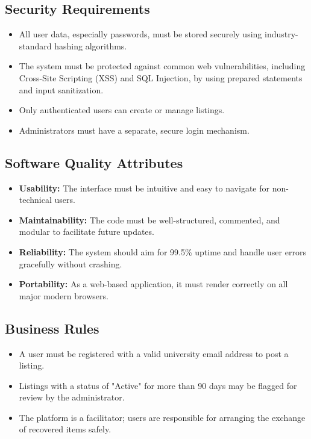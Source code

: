\documentclass[11pt, a4paper]{article}
\begin{document}
\subsection{Security Requirements}
\begin{itemize}
    \item All user data, especially passwords, must be stored securely using industry-standard hashing algorithms.
    \item The system must be protected against common web vulnerabilities, including Cross-Site Scripting (XSS) and SQL Injection, by using prepared statements and input sanitization.
    \item Only authenticated users can create or manage listings.
    \item Administrators must have a separate, secure login mechanism.
\end{itemize}

\subsection{Software Quality Attributes}
\begin{itemize}
    \item \textbf{Usability:} The interface must be intuitive and easy to navigate for non-technical users.
    \item \textbf{Maintainability:} The code must be well-structured, commented, and modular to facilitate future updates.
    \item \textbf{Reliability:} The system should aim for 99.5\% uptime and handle user errors gracefully without crashing.
    \item \textbf{Portability:} As a web-based application, it must render correctly on all major modern browsers.
\end{itemize}

\subsection{Business Rules}
\begin{itemize}
    \item A user must be registered with a valid university email address to post a listing.
    \item Listings with a status of "Active" for more than 90 days may be flagged for review by the administrator.
    \item The platform is a facilitator; users are responsible for arranging the exchange of recovered items safely.
\end{itemize}
\end{document}
